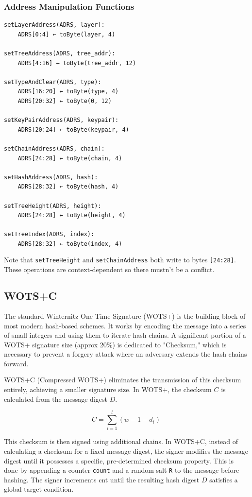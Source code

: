 \subsubsection{Address Manipulation Functions}
\begin{verbatim}
setLayerAddress(ADRS, layer):
    ADRS[0:4] ← toByte(layer, 4)

setTreeAddress(ADRS, tree_addr):
    ADRS[4:16] ← toByte(tree_addr, 12)

setTypeAndClear(ADRS, type):
    ADRS[16:20] ← toByte(type, 4)
    ADRS[20:32] ← toByte(0, 12)

setKeyPairAddress(ADRS, keypair):
    ADRS[20:24] ← toByte(keypair, 4)

setChainAddress(ADRS, chain):
    ADRS[24:28] ← toByte(chain, 4)

setHashAddress(ADRS, hash):
    ADRS[28:32] ← toByte(hash, 4)

setTreeHeight(ADRS, height):
    ADRS[24:28] ← toByte(height, 4)

setTreeIndex(ADRS, index):
    ADRS[28:32] ← toByte(index, 4)
\end{verbatim}

Note that \texttt{setTreeHeight} and \texttt{setChainAddress} both write to bytes \texttt{[24:28]}. These operations are context-dependent so there mustn't be a conflict.


\subsection{WOTS+C}
The standard Winternitz One-Time Signature (WOTS+) is the building block of most modern hash-based schemes. It works by encoding the message into a series of small integers and using them to iterate hash chains. A significant portion of a WOTS+ signature size (approx 20\%) is dedicated to "Checksum," which is necessary to prevent a forgery attack where an adversary extends the hash chains forward.

WOTS+C (Compressed WOTS+) eliminates the transmission of this checksum entirely, achieving a smaller signature size. In WOTS+, the checksum $C$ is calculated from the message digest $D$.

$$C = \sum_{i=1}^{l} (w - 1 - d_i)$$

This checksum is then signed using additional chains. In WOTS+C, instead of calculating a checksum 
for a fixed message digest, the signer modifies the message digest until it possesses a specific, 
pre-determined checksum property. This is done by appending a counter \texttt{count} and a random 
salt \texttt{R} to the message before hashing. The signer increments cnt until the resulting hash digest $D$ satisfies a global target condition.

